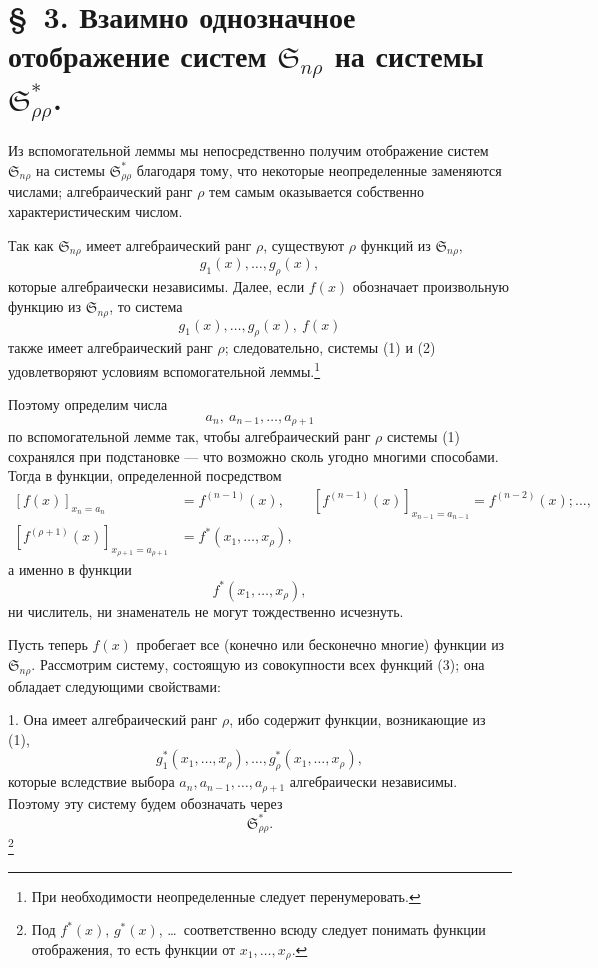 \documentclass[11pt]{article}
\providecommand{\Ssys}{\mathfrak{S}}
\begin{document}
\section*{\S\ 3. Взаимно однозначное отображение систем $\Ssys_{n\rho}$ на системы $\Ssys^*_{\rho\rho}$.}

Из вспомогательной леммы мы непосредственно получим отображение систем $\Ssys_{n\rho}$ на системы $\Ssys^*_{\rho\rho}$ благодаря тому, что некоторые неопределенные заменяются числами; алгебраический ранг $\rho$ тем самым оказывается собственно характеристическим числом.

Так как $\Ssys_{n\rho}$ имеет алгебраический ранг $\rho$, существуют $\rho$ функций из $\Ssys_{n\rho}$,
\begin{equation}
  g_1(x),\ldots,g_\rho(x),
\tag{1}
\end{equation}
которые алгебраически независимы. Далее, если $f(x)$ обозначает произвольную функцию из $\Ssys_{n\rho}$, то система
\begin{equation}
  g_1(x),\ldots,g_\rho(x),\ f(x)
\tag{2}
\end{equation}
также имеет алгебраический ранг $\rho$; следовательно, системы (1) и (2) удовлетворяют условиям вспомогательной леммы.\footnote{При необходимости неопределенные следует перенумеровать.}

Поэтому определим числа
\[
  a_n,\ a_{n-1},\ldots,a_{\rho+1}
\]
по вспомогательной лемме так, чтобы алгебраический ранг $\rho$ системы (1) сохранялся при подстановке --- что возможно сколь угодно многими способами. Тогда в функции, определенной посредством
\[
\begin{aligned}
 [f(x)]_{x_n=a_n}&=f^{(n-1)}(x),\qquad
 [f^{(n-1)}(x)]_{x_{n-1}=a_{n-1}}=f^{(n-2)}(x);\ldots,\\
 [f^{(\rho+1)}(x)]_{x_{\rho+1}=a_{\rho+1}}&=f^*(x_1,
\ldots,x_\rho),
\end{aligned}
\]
а именно в функции
\begin{equation}
  f^*(x_1,\ldots,x_\rho),
\tag{3}
\end{equation}
ни числитель, ни знаменатель не могут тождественно исчезнуть.

Пусть теперь $f(x)$ пробегает все (конечно или бесконечно многие) функции из $\Ssys_{n\rho}$. Рассмотрим систему, состоящую из совокупности всех функций (3); она обладает следующими свойствами:

1. Она имеет алгебраический ранг $\rho$, ибо содержит функции, возникающие из (1),
\[
  g_1^*(x_1,
\ldots,x_\rho),\ldots,g_\rho^*(x_1,\ldots,x_\rho),
\]
которые вследствие выбора $a_n,a_{n-1},\ldots,a_{\rho+1}$ алгебраически независимы. Поэтому эту систему будем обозначать через
\[
  \Ssys^*_{\rho\rho}.
\]
\footnote{Под $f^*(x)$, $g^*(x)$, \ldots\ соответственно всюду следует понимать функции отображения, то есть функции от $x_1,\ldots,x_\rho$.}
\end{document}
